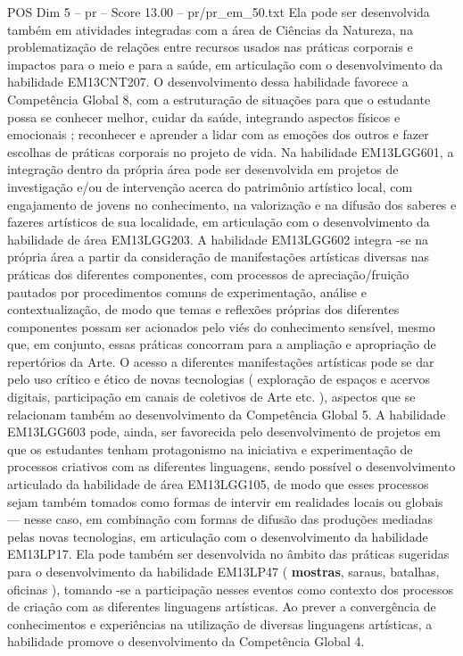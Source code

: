 \begin{textsample}{POS Dim 5 – pr – Score 13.00 – pr/pr\_em\_50.txt}
Ela pode ser desenvolvida também em atividades integradas com a área de Ciências da Natureza, na problematização de relações entre recursos usados nas práticas corporais e impactos para o meio e para a saúde, em articulação com o desenvolvimento da habilidade EM13CNT207.
O desenvolvimento dessa habilidade favorece a Competência Global 8, com a estruturação de situações para que o estudante possa se conhecer melhor, cuidar da saúde, integrando aspectos físicos e emocionais ; reconhecer e aprender a lidar com as emoções dos outros e fazer escolhas de práticas corporais no projeto de vida.
Na habilidade EM13LGG601, a integração dentro da própria área pode ser desenvolvida em projetos de investigação e/ou de intervenção acerca do patrimônio artístico local, com engajamento de jovens no conhecimento, na valorização e na difusão dos saberes e fazeres artísticos de sua localidade, em articulação com o desenvolvimento da habilidade de área EM13LGG203.
A habilidade EM13LGG602 integra -se na própria área a partir da consideração de manifestações artísticas diversas nas práticas dos diferentes componentes, com processos de apreciação/fruição pautados por procedimentos comuns de experimentação, análise e contextualização, de modo que temas e reflexões próprias dos diferentes componentes possam ser acionados pelo viés do conhecimento sensível, mesmo que, em conjunto, essas práticas concorram para a ampliação e apropriação de repertórios da Arte.
O acesso a diferentes manifestações artísticas pode se dar pelo uso crítico e ético de novas tecnologias ( exploração de espaços e acervos digitais, participação em canais de coletivos de Arte etc. ), aspectos que se relacionam também ao desenvolvimento da Competência Global 5.
A habilidade EM13LGG603 pode, ainda, ser favorecida pelo desenvolvimento de projetos em que os estudantes tenham protagonismo na iniciativa e experimentação de processos criativos com as diferentes linguagens, sendo possível o desenvolvimento articulado da habilidade de área EM13LGG105, de modo que esses processos sejam também tomados como formas de intervir em realidades locais ou globais — nesse caso, em combinação com formas de difusão das produções mediadas pelas novas tecnologias, em articulação com o desenvolvimento da habilidade EM13LP17.
Ela pode também ser desenvolvida no âmbito das práticas sugeridas para o desenvolvimento da habilidade EM13LP47 ( \textbf{mostras}, saraus, batalhas, oficinas ), tomando -se a participação nesses eventos como contexto dos processos de criação com as diferentes linguagens artísticas.
Ao prever a convergência de conhecimentos e experiências na utilização de diversas linguagens artísticas, a habilidade promove o desenvolvimento da Competência Global 4.

\end{textsample}
